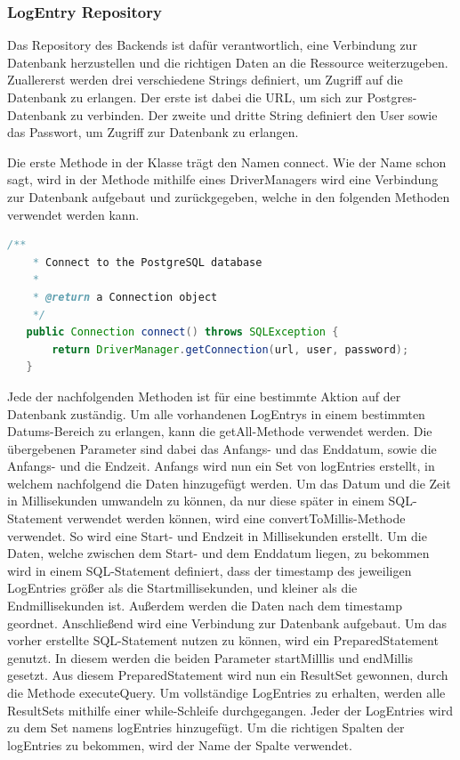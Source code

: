 \subsubsection{LogEntry Repository}
Das Repository des Backends ist dafür verantwortlich, eine Verbindung zur Datenbank herzustellen und die richtigen Daten an die Ressource weiterzugeben. Zuallererst werden drei verschiedene Strings definiert, um Zugriff auf die Datenbank zu erlangen. Der erste ist dabei die URL, um sich zur Postgres-Datenbank zu verbinden. Der zweite und dritte String definiert den User sowie das Passwort, um Zugriff zur Datenbank zu erlangen. 

Die erste Methode in der Klasse trägt den Namen connect. Wie der Name schon sagt, wird in der Methode mithilfe eines DriverManagers wird eine Verbindung zur Datenbank aufgebaut und zurückgegeben, welche in den folgenden Methoden verwendet werden kann. 

\begin{lstlisting}[language=java,caption=Connect to SQL Database,label=lst:impl:foo]
    /**
    * Connect to the PostgreSQL database
    *
    * @return a Connection object
    */
   public Connection connect() throws SQLException {
       return DriverManager.getConnection(url, user, password);
   }   
\end{lstlisting}

Jede der nachfolgenden Methoden ist für eine bestimmte Aktion auf der Datenbank zuständig. 
Um alle vorhandenen LogEntrys in einem bestimmten Datums-Bereich zu erlangen, kann die getAll-Methode verwendet werden. Die übergebenen Parameter sind dabei das Anfangs- und das Enddatum, sowie die Anfangs- und die Endzeit. Anfangs wird nun ein Set von logEntries erstellt, in welchem nachfolgend die Daten hinzugefügt werden. Um das Datum und die Zeit in Millisekunden umwandeln zu können, da nur diese später in einem SQL-Statement verwendet werden können, wird eine convertToMillis-Methode verwendet. So wird eine Start- und Endzeit in Millisekunden erstellt. 
Um die Daten, welche zwischen dem Start- und dem Enddatum liegen, zu bekommen wird in einem SQL-Statement definiert, dass der timestamp des jeweiligen LogEntries größer als die Startmillisekunden, und kleiner als die Endmillisekunden ist. Außerdem werden die Daten nach dem timestamp geordnet. Anschließend wird eine Verbindung zur Datenbank aufgebaut. Um das vorher erstellte SQL-Statement nutzen zu können, wird ein PreparedStatement genutzt. In diesem werden die beiden Parameter startMilllis und endMillis gesetzt. Aus diesem PreparedStatement wird nun ein ResultSet gewonnen, durch die Methode executeQuery. Um vollständige LogEntries zu erhalten, werden alle ResultSets mithilfe einer while-Schleife durchgegangen. Jeder der LogEntries wird zu dem Set namens logEntries hinzugefügt. Um die richtigen Spalten der logEntries zu bekommen, wird der Name der Spalte verwendet. 


